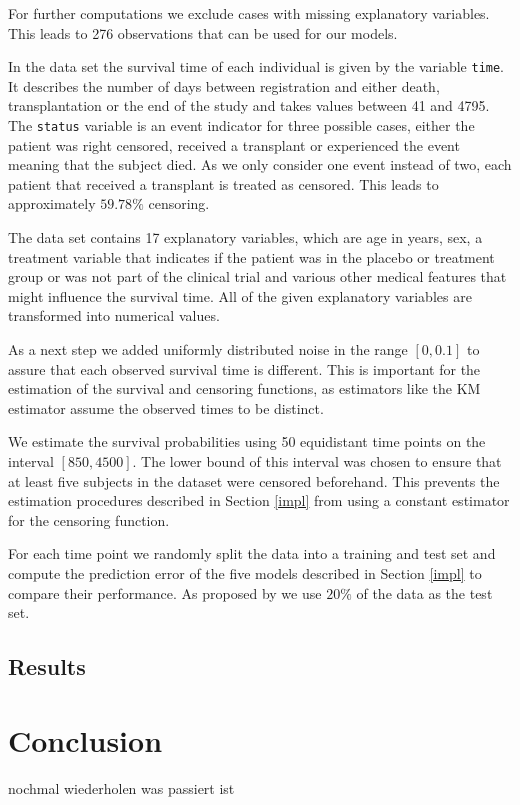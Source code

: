\documentclass[12pt, a4paper]{scrartcl}
\theoremstyle{definition}
\theoremstyle{plain}
\numberwithin{equation}{section}
\numberwithin{figure}{section}
\numberwithin{table}{section}
\begin{document}
	For further computations we exclude cases with missing explanatory variables.
	This leads to 276 observations that can be used for our models.
	
	In the data set the survival time of each individual is given by the variable \texttt{time}.
	It describes the number of days between registration and either death, transplantation or the end of the study and takes values between 41 and 4795.
	The \texttt{status} variable is an event indicator for three possible cases, either the patient was right censored, received a transplant or experienced the event meaning that the subject died.
	As we only consider one event instead of two, each patient that received a transplant is treated as censored.
	This leads to approximately $59.78\%$ censoring.
	
	The data set contains 17 explanatory variables, which are age in years, sex, a treatment variable that indicates if the patient was in the placebo or treatment group or was not part of the clinical trial and various other medical features that might influence the survival time.
	All of the given explanatory variables are transformed into numerical values.
	
	As a next step we added uniformly distributed noise in the range $[0, 0.1]$ to assure that each observed survival time is different.
	This is important for the estimation of the survival and censoring functions, as estimators like the KM estimator assume the observed times to be distinct.
	
	We estimate the survival probabilities using 50 equidistant time points on the interval $[850,4500]$.
	The lower bound of this interval was chosen to ensure that at least five subjects in the dataset were censored beforehand.
	This prevents the estimation procedures described in Section \ref{impl} from using a constant estimator for the censoring function.
	
	For each time point we randomly split the data into a training and test set and compute the prediction error of the five models described in Section \ref{impl} to compare their performance. 
	As proposed by \citet*{basearticle} we use $20\%$ of the data as the test set. 
	\subsection{Results}
	
	\newpage
	\section{Conclusion}
	nochmal wiederholen was passiert ist
	
\end{document}
